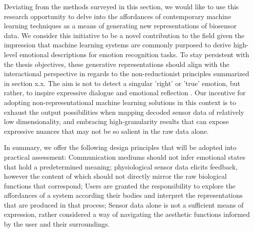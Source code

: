 Deviating from the methods surveyed in this section, we would like to use this research opportunity to delve into the affordances of contemporary machine learning techniques as a means of generating new representations of biosensor data. We consider this initiative to be a novel contribution to the field given the impression that machine learning systems are commonly purposed to derive high-level emotional descriptions for emotion recognition tasks. To stay persistent with the thesis objectives, these generative representations should align with the interactional perspective in regards to the non-reductionist principles summarized in section x.x. The aim is not to detect a singular 'right' or 'true' emotion, but rather, to inspire expressive dialogue and emotional reflection \cite{hook_affective_2009}. Our incentive for adopting non-representational machine learning solutions in this context is to exhaust the output possibilities when mapping decoded sensor data of relatively low dimensionality, and embracing high-granularity results that can expose expressive nuances that may not be so salient in the raw data alone.



In summary, we offer the following design principles that will be adopted into practical assessment: Communication mediums should not infer emotional states that hold a predetermined meaning; physiological sensor data elicits feedback, however the content of which should not directly mirror the raw biological functions that correspond; Users are granted the responsibility to explore the affordances of a system according their bodies and interpret the representations that are produced in that process; Sensor data alone is not a sufficient means of expression, rather considered a way of navigating the aesthetic functions informed by the user and their surroundings.


